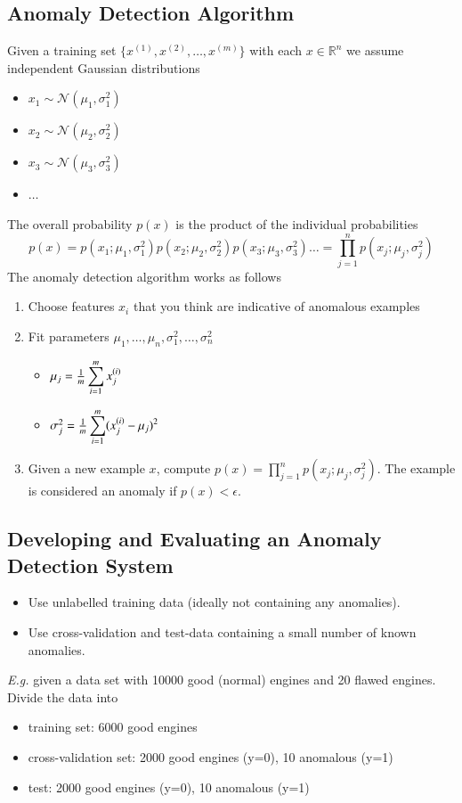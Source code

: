 \documentclass[a4paper,twoside,10pt]{article}
\begin{document}
\subsection{Anomaly Detection Algorithm}
Given a training set $\{x^{(1)},x^{(2)},\ldots,x^{(m)}\}$ with each $x\in\mathbb{R}^n$
we assume independent Gaussian distributions
\begin{itemize}
\item $x_1\sim\mathcal{N}(\mu_1,\sigma^2_1)$
\item $x_2\sim\mathcal{N}(\mu_2,\sigma^2_2)$
\item $x_3\sim\mathcal{N}(\mu_3,\sigma^2_3)$
\item $\ldots$
\end{itemize}
The overall probability $p(x)$ is the product of the individual probabilities
\begin{equation*}
  p(x)=p(x_1;\mu_1,\sigma_1^2) p(x_2;\mu_2,\sigma_2^2) p(x_3;\mu_3,\sigma_3^2) \ldots=
  \prod_{j=1}^n p(x_j;\mu_j,\sigma_j^2)
\end{equation*}
The anomaly detection algorithm works as follows
\begin{enumerate}
  \item Choose features $x_i$ that you think are indicative of anomalous examples
  \item Fit parameters $\mu_1,\ldots,\mu_n,\sigma_1^2,\ldots,\sigma_n^2$
    \begin{itemize}
    \item $\mu_j=\frac{1}{m}\displaystyle\sum_{i=1}^mx^{(i)}_j$
    \item $\sigma_j^2=\frac{1}{m}\displaystyle\sum_{i=1}^m(x^{(i)}_j-\mu_j)^2$
    \end{itemize}
  \item Given a new example $x$, compute $p(x)=\prod_{j=1}^n p(x_j;\mu_j,\sigma_j^2)$. The example is considered an anomaly if $p(x)<\epsilon$.
\end{enumerate}

\subsection{Developing and Evaluating an Anomaly Detection System}
\begin{itemize}
  \item Use unlabelled training data (ideally not containing any anomalies).
  \item Use cross-validation and test-data containing a small number of known anomalies.
\end{itemize}
\emph{E.g.} given a data set with 10000 good (normal) engines and 20 flawed engines.
Divide the data into
\begin{itemize}
  \item training set: 6000 good engines
  \item cross-validation set: 2000 good engines (y=0), 10 anomalous (y=1)
  \item test: 2000 good engines (y=0), 10 anomalous (y=1)
\end{itemize}
\end{document}
